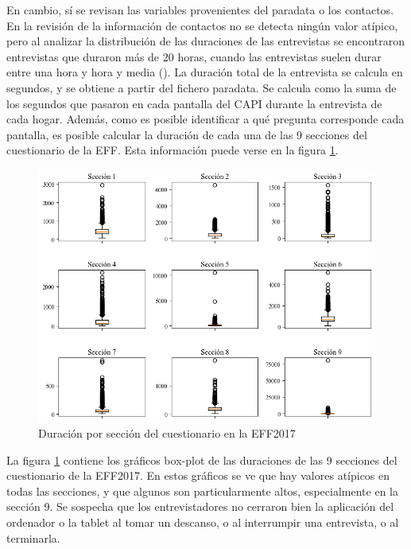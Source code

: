 En cambio, sí se revisan las variables provenientes del paradata o los contactos. En la revisión de la información de contactos no se detecta ningún valor atípico, pero al analizar la distribución de las duraciones de las entrevistas se encontraron entrevistas que duraron más de 20 horas, cuando las entrevistas suelen durar entre una hora y hora y media (\cite{effmethod2017}). La duración total de la entrevista se calcula en segundos, y se obtiene a partir del fichero paradata. Se calcula como la suma de los segundos que pasaron en cada pantalla del CAPI durante la entrevista de cada hogar. Además, como es posible identificar a qué pregunta corresponde cada pantalla, es posible calcular la duración de cada una de las 9 secciones del cuestionario de la EFF. Esta información puede verse en la figura \ref{fig:fig4}.

\begin{figure}[htbp]
	\centering
	\includegraphics[width=1\textwidth]{figs/figure4.png}
	\caption{Duración por sección del cuestionario en la EFF2017}
	\label{fig:fig4}
\end{figure}

La figura \ref{fig:fig4} contiene los gráficos box-plot de las duraciones de las 9 secciones del cuestionario de la EFF2017. En estos gráficos se ve que hay valores atípicos en todas las secciones, y que algunos son particularmente altos, especialmente en la sección 9. Se sospecha que los entrevistadores no cerraron bien la aplicación del ordenador o la tablet al tomar un descanso, o al interrumpir una entrevista, o al terminarla.

